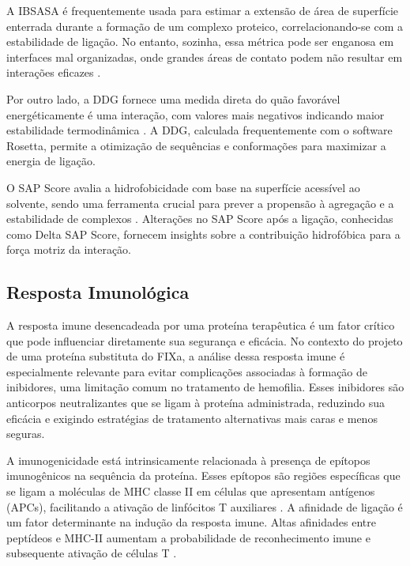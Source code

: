 A IBSASA é frequentemente usada para estimar a extensão de área de superfície enterrada durante a formação de um complexo proteico,
correlacionando-se com a estabilidade de ligação. 
No entanto, sozinha, essa métrica pode ser enganosa em interfaces mal organizadas, 
onde grandes áreas de contato podem não resultar em interações eficazes \cite{Docking}. 

Por outro lado, a DDG fornece uma medida direta do quão favorável energéticamente é uma interação,
com valores mais negativos indicando maior estabilidade termodinâmica \cite{Docking}. 
A DDG, calculada frequentemente com o software Rosetta, 
permite a otimização de sequências e conformações para maximizar a energia de ligação.

O SAP Score avalia a hidrofobicidade com base na superfície acessível ao solvente, 
sendo uma ferramenta crucial para prever a propensão à agregação e a estabilidade de complexos \cite{Docking}.
Alterações no SAP Score após a ligação, conhecidas como Delta SAP Score, 
fornecem insights sobre a contribuição hidrofóbica para a força motriz da interação.






\subsection{Resposta Imunológica}
\label{subsection:RespImuno} 

A resposta imune desencadeada por uma proteína terapêutica é um fator crítico que pode influenciar diretamente sua segurança e eficácia. 
No contexto do projeto de uma proteína substituta do FIXa,
a análise dessa resposta imune é especialmente relevante para evitar complicações associadas à formação de inibidores,
uma limitação comum no tratamento de hemofilia. 
Esses inibidores são anticorpos neutralizantes que se ligam à proteína administrada,
reduzindo sua eficácia e exigindo estratégias de tratamento alternativas mais caras e menos seguras.

A imunogenicidade está intrinsicamente relacionada à presença de epítopos imunogênicos na sequência da proteína. 
Esses epítopos são regiões específicas que se ligam a moléculas de MHC classe II em células que apresentam antígenos (APCs), 
facilitando a ativação de linfócitos T auxiliares \cite{Imuno}. 
A afinidade de ligação é um fator determinante na indução da resposta imune. 
Altas afinidades entre peptídeos e MHC-II aumentam a probabilidade de reconhecimento imune e subsequente ativação de células T \cite{Imuno}.

